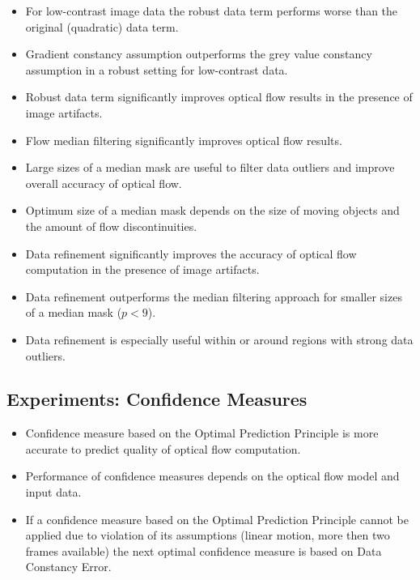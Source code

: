 \begin{itemize}
	\item For low-contrast image data the robust data term performs worse than the original (quadratic) data term.
	
	\item Gradient constancy assumption outperforms the grey value constancy assumption in a robust setting for low-contrast data.
	
	\item Robust data term significantly improves optical flow results in the presence of image artifacts.
	
	\item Flow median filtering significantly improves optical flow results.
	
	\item Large sizes of a median mask are useful to filter data outliers and improve overall accuracy of optical flow.
	
	\item Optimum size of a median mask depends on the size of moving objects and the amount of flow discontinuities.
	
	\item Data refinement significantly improves the accuracy of optical flow computation in the presence of image artifacts.
	
	\item Data refinement outperforms the median filtering approach for smaller sizes of a median mask ($p < 9$).
	
	\item Data refinement is especially useful within or around regions with strong data outliers.
	
	
\end{itemize}
	
\subsection*{Experiments: Confidence Measures}


\begin{itemize}
	\item Confidence measure based on the Optimal Prediction Principle is more accurate to predict quality of optical flow computation.
	
	\item Performance of confidence measures depends on the optical flow model and input data. 
	
	\item If a confidence measure based on the Optimal Prediction Principle cannot be applied due to violation of its assumptions (linear motion, more then two frames available) the next optimal confidence measure is based on Data Constancy Error.
\end{itemize}




   




